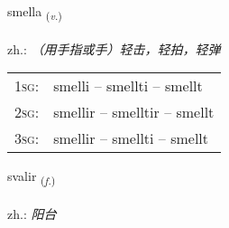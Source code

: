 \documentclass[frontgrid, backgrid]{flacards}\usepackage[]{graphicx}\usepackage[]{xcolor}
\begin{document}
\renewcommand{\flhead}{\vskip5pt \fboxsep=0pt {\small\bfseries\footnotesize Sagnorð | 动词}}
\renewcommand{\fcfoot}{\vskip5pt \fboxsep=0pt \hspace{2pt}{\small\bfseries\footnotesize 3K}}

\renewcommand{\blhead}{\vskip5pt {\small\bfseries\footnotesize Sagnorð | 动词 }}
\renewcommand{\bcfoot}{\vskip5pt \hspace{2pt}{\small\bfseries\footnotesize 3K}}


{smella \small{\textsubscript{(\textit{v.})}} \\[1ex] %
\textphonetic{[smɛtla]} \\
zh.: \emph{（用手指或手）轻击，轻拍，轻弹} \\  [2ex]
\renewcommand*{\arraystretch}{0.8}
\begin{tabular}{p{1cm}l}
\textsc{1sg}: & smelli -- smellti -- smellt \\ 
\textsc{2sg}: & smellir -- smelltir -- smellt \\ 
\textsc{3sg}: & smellir -- smellti -- smellt \\ 
\end{tabular}
}

\renewcommand{\flhead}{\vskip5pt \fboxsep=0pt {\small\bfseries\footnotesize Nafnorð | 名词}}
\renewcommand{\fcfoot}{\vskip5pt \fboxsep=0pt \hspace{2pt}{\small\bfseries\footnotesize 3K}}

\renewcommand{\blhead}{\vskip5pt {\small\bfseries\footnotesize Nafnorð | 名词 }}
\renewcommand{\bcfoot}{\vskip5pt \hspace{2pt}{\small\bfseries\footnotesize 3K}}


{svalir \small{\textsubscript{(\textit{f.})}} \\[1ex] %
\textphonetic{[svaːlɪr]} \\
zh.: \emph{阳台} \\  [2ex]
\renewcommand*{\arraystretch}{0.8}
}
\end{document}
